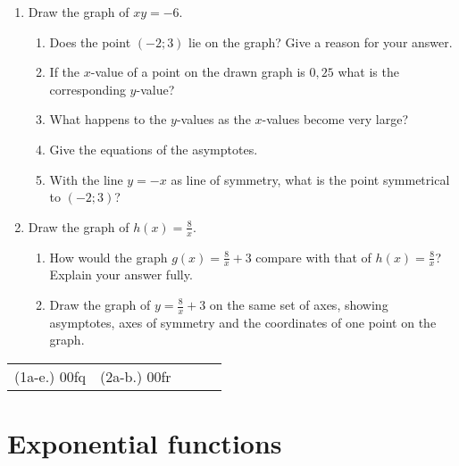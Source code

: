 \begin{exercises}{}{
\begin{enumerate}[noitemsep, label=\textbf{\arabic*}. ] 
\item Draw the graph of $xy=-6$.
  \begin{enumerate}[noitemsep, label=\textbf{(\alph*)} ] 
  \item Does the point $(-2; 3)$ lie on the graph? Give a reason for your answer.
  \item If the $x$-value of a point on the drawn graph is $0,25$ what is the corresponding $y$-value?
  \item What happens to the $y$-values as the $x$-values become very large?
  \item Give the equations of the asymptotes.
  \item With the line $y=-x$ as line of symmetry, what is the point symmetrical to $(-2; 3)$?
  \end{enumerate}
\item Draw the graph of $h(x)=\frac{8}{x}$.
  \begin{enumerate}[noitemsep, label=\textbf{(\alph*)} ] 
  \item How would the graph $g(x)=\frac{8}{x}+3$ compare with that of $h(x)=\frac{8}{x}$? Explain your answer fully.
  \item Draw the graph of $y=\frac{8}{x}+3$ on the same set of axes, showing asymptotes, axes of symmetry and the coordinates of one point on the graph.
  \end{enumerate}
\end{enumerate}
\practiceinfo
\par 
\par \begin{tabular}[h]{ccccc}
(1a-e.) 00fq&  (2a-b.) 00fr& \end{tabular}
}
\end{exercises}

\section{Exponential functions}

